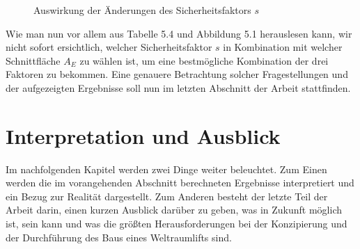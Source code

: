 \documentclass[a4paper, 10pt]{report}
\begin{document}
\begin{figure}[htb]
\caption{Auswirkung der Änderungen des Sicherheitsfaktors \( s \)} 
\end{figure} 

Wie man nun vor allem aus Tabelle 5.4 und Abbildung 5.1 herauslesen kann, wir nicht sofort ersichtlich, welcher Sicherheitsfaktor \( s \)  in Kombination mit welcher Schnittfläche \( A_E \) zu wählen ist, um eine bestmögliche Kombination der drei Faktoren zu bekommen. Eine genauere Betrachtung solcher Fragestellungen und der aufgezeigten Ergebnisse soll nun im letzten Abschnitt der Arbeit stattfinden.  

\chapter{Interpretation und Ausblick}
Im nachfolgenden Kapitel werden zwei Dinge weiter beleuchtet. Zum Einen werden die im vorangehenden Abschnitt berechneten Ergebnisse interpretiert und ein Bezug zur Realität dargestellt. Zum Anderen besteht der letzte Teil der Arbeit darin, einen kurzen Ausblick darüber zu geben, was in Zukunft möglich ist, sein kann und was die größten Herausforderungen bei der Konzipierung und der Durchführung des Baus eines Weltraumlifts sind.
\end{document}
